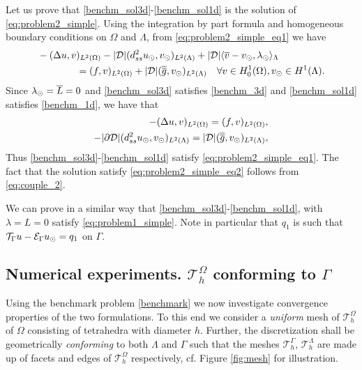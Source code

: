\documentclass[r]{siamart171218}
\begin{document}
Let us prove that \eqref{benchm_sol3d}-\eqref{benchm_sol1d} is the solution of
\eqref{eq:problem2_simple}. Using the integration by part formula and homogeneous
boundary conditions on $\Omega$ and $\Lambda$, from \eqref{eq:problem2_simple_eq1} we have
\begin{align*}
&-(\Delta u, v)_{L^2(\Omega)} - |{\cal D}|(d^2_{ss} \ud, \vd)_{L^2(\Lambda)} 
+ |{\cal D}|\langle \avrc{v}  - \vd, \ld \rangle_\Lambda
\\
\nonumber
&\qquad\qquad= (f,v)_{L^2(\Omega)} + |{\cal D}| (\avrd{g},\vd)_{L^2(\Lambda)}
\quad \forall v \in H^1_0(\Omega), \vd \in H^1(\Lambda).
\\
\end{align*}
Since $\lambda_{\odot}=\overline{L}=0$ and \eqref{benchm_sol3d} satisfies \eqref{benchm_3d} and \eqref{benchm_sol1d}
satisfies \eqref{benchm_1d}, we have that
\begin{align*}
-(\Delta u, v)_{L^2(\Omega)} =  (f,v)_{L^2(\Omega)}, \\
-|{\partial \cal D}|(d^2_{ss} \ud, \vd)_{L^2(\Lambda)}  = |{\cal D}| (\avrd{g},\vd)_{L^2(\Lambda)},
\end{align*}
Thus \eqref{benchm_sol3d}-\eqref{benchm_sol1d} satisfy \eqref{eq:problem2_simple_eq1}.
The fact that the solution satisfy \eqref{eq:problem2_simple_eq2} follows from \eqref{eq:couple_2}.

We can prove in a similar way that \eqref{benchm_sol3d}-\eqref{benchm_sol1d}, with $\lambda=L=0$
satisfy \eqref{eq:problem1_simple}. Note in particular that $q_1$ is such that
${\mathcal{T}_\Gamma}{u} - \mathcal{E}_\Gamma{u_{\odot}} = q_1$ on $\Gamma$.

\subsection{Numerical experiments. $\mathcal{T}^{\Omega}_h$ conforming to $\Gamma$}\label{sec:experiment_conform}
Using the benchmark problem \eqref{benchmark} we now investigate convergence
properties of the two formulations. To this end we consider a \emph{uniform} mesh
of $\mathcal{T}^{\Omega}_h$ of $\Omega$ consisting of tetrahedra with diameter $h$.
Further, the discretization shall be geometrically \emph{conforming} to both $\Lambda$
and $\Gamma$ such that the meshes $\mathcal{T}^{\Gamma}_h$, $\mathcal{T}^{\Lambda}_h$
are made up of facets and edges of $\mathcal{T}^{\Omega}_h$ respectively, cf. Figure \ref{fig:mesh}
for illustration.
\end{document}

